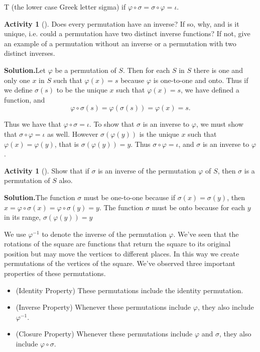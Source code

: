 \documentclass[10pt,]{book}
\theoremstyle{plain}
\theoremstyle{definition}
\newtheorem{activity}[project]{Activity}
\numberwithin{equation}{chapter}
\begin{document}
\rightarrow T\) (the lower case Greek letter sigma) if \(\varphi\circ \sigma= \sigma
\circ\varphi =
\iota\).%
\begin{activity}[]\label{activity-253}
Does every permutation have an inverse? If so, why, and is it unique, i.e. could a permutation have two distinct inverse functions? If not, give an example of a permutation without an inverse or a permutation with two distinct inverses.%
\par\medskip\noindent%
\textbf{Solution.}\quad Let \(\varphi\) be a permutation of \(S\). Then for each \(S\) in \(S\) there is one and only one \(x\) in \(S\) such that \(\varphi(x) = s\) because \(\varphi\) is one-to-one and onto. Thus if we define \(\sigma(s)\) to be the unique \(x\) such that \(\varphi(x) = s\), we have defined a function, and%
\begin{equation*}
\varphi\circ\sigma (s) = \varphi(\sigma(s)) = \varphi(x) = s.
\end{equation*}
%
\par
Thus we have that \(\varphi\circ\sigma = \iota\). To show that \(\sigma\) is an inverse to \(\varphi\), we must show that \(\sigma\circ\varphi = \iota\) as well. However \(\sigma(\varphi(y))\) is the unique \(x\) such that \(\varphi(x) = \varphi(y)\), that is \(\sigma(\varphi(y)) = y\). Thus \(\sigma\circ\varphi = \iota\), and \(\sigma\) is an inverse to \(\varphi\).%
\end{activity}
\begin{activity}[]\label{activity-254}
Show that if \(\sigma\) is an inverse of the permutation \(\varphi\) of \(S\), then \(\sigma\) is a permutation of \(S\) also.%
\par\medskip\noindent%
\textbf{Solution.}\quad The function \(\sigma\) must be one-to-one because if \(\sigma(x)=\sigma(y)\), then \(x=\varphi\circ\sigma(x)=\varphi\circ\sigma(y)=y\). The function \(\sigma\) must be onto because for each \(y\) in its range, \(\sigma(\varphi(y)) = y\)%
\end{activity}
We use \(\varphi^{-1}\) to denote the inverse of the permutation \(\varphi\). We've seen that the rotations of the square are functions that return the square to its original position but may move the vertices to different places. In this way we create permutations of the vertices of the square. We've observed three important properties of these permutations. \leavevmode%
\begin{itemize}[label=\textbullet]
\item{}(Identity Property) These permutations include the identity permutation.%
\item{}(Inverse Property) Whenever these permutations include \(\varphi\), they also include \(\varphi^{-1}\).%
\item{}(Closure Property)  Whenever these permutations include \(\varphi\) and \(\sigma\), they also include \(\varphi\circ\sigma\).%
\end{itemize}
\end{document}

